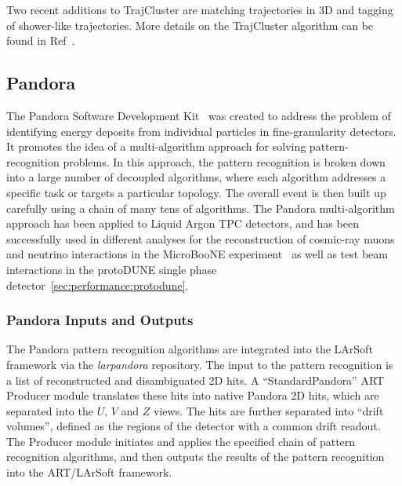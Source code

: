 Two recent additions to TrajCluster are matching trajectories in 3D and tagging of shower-like trajectories. More details on the TrajCluster algorithm can be found in Ref~\cite{ref:trajcluster}.



\subsection{Pandora}\label{sec:Pandora}

The Pandora Software Development Kit~\cite{Marshall:2015rfa} was created to address the problem of identifying energy deposits from individual particles in fine-granularity detectors. It promotes the idea of a multi-algorithm approach for solving pattern-recognition problems. In this approach, the pattern recognition is broken down into a large number of decoupled algorithms, where each algorithm addresses a specific task or targets a particular topology. The overall event is then built up carefully using a chain of many tens of algorithms. The Pandora multi-algorithm approach has been applied to Liquid Argon TPC detectors, and has been successfully used in different analyses for the reconstruction of cosmic-ray muons and neutrino interactions in the MicroBooNE experiment~\cite{Acciarri:2017hat} as well as test beam interactions in the protoDUNE single phase detector~\ref{sec:performance:protodune}.


\subsubsection{Pandora Inputs and Outputs}

The Pandora pattern recognition algorithms are integrated into the LArSoft framework via the {\it larpandora} repository. The input to the pattern recognition is a list of reconstructed and disambiguated 2D hits. A ``StandardPandora'' ART Producer module translates these hits into native Pandora 2D hits, which are separated into the $U$, $V$ and $Z$ views. The hits are further separated into ``drift volumes'', defined as the regions of the detector with a common drift readout. The Producer module initiates and applies the specified chain of pattern recognition algorithms, and then outputs the results of the pattern recognition into the ART/LArSoft framework.


